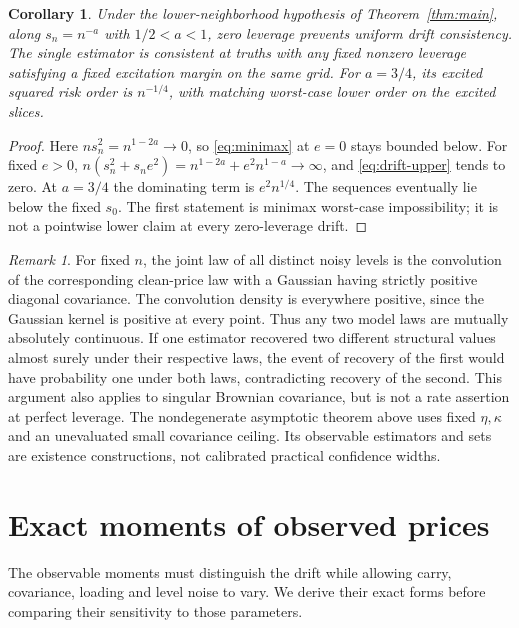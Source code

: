 \documentclass[11pt,a4paper]{amsart}
\theoremstyle{plain}
\newtheorem{corollary}[theorem]{Corollary}
\theoremstyle{definition}
\theoremstyle{remark}
\newtheorem{remark}[theorem]{Remark}
\begin{document}
\begin{corollary}\label{cor:separation}
Under the lower-neighborhood hypothesis of Theorem~\ref{thm:main}, along
$s_n=n^{-a}$ with $1/2<a<1$, zero leverage prevents uniform drift
consistency. The single estimator is consistent at truths with any fixed
nonzero leverage satisfying a fixed excitation margin on the same grid.
For $a=3/4$, its excited squared risk order is $n^{-1/4}$, with matching
worst-case lower order on the excited slices.
\end{corollary}
\begin{proof}
Here $ns_n^2=n^{1-2a}\to0$, so \eqref{eq:minimax} at $e=0$ stays bounded
below. For fixed $e>0$,
$n(s_n^2+s_ne^2)=n^{1-2a}+e^2n^{1-a}\to\infty$, and
\eqref{eq:drift-upper} tends to zero. At $a=3/4$ the dominating term is
$e^2n^{1/4}$. The sequences eventually lie below the fixed $s_0$.
The first statement is minimax worst-case impossibility; it is not a
pointwise lower claim at every zero-leverage drift.
\end{proof}

\begin{remark}\label{rem:finite-noise}
For fixed $n$, the joint law of all distinct noisy levels is the convolution
of the corresponding clean-price law with a Gaussian having strictly
positive diagonal covariance. The convolution density is everywhere
positive, since the Gaussian kernel is positive at every point. Thus any
two model laws are mutually absolutely continuous. If one estimator
recovered two different structural values almost surely under their
respective laws, the event of recovery of the first would have probability
one under both laws, contradicting recovery of the second. This argument
also applies to singular Brownian covariance, but is not a rate assertion
at perfect leverage. The nondegenerate asymptotic theorem above uses fixed
$\eta,\kappa$ and an unevaluated small covariance ceiling. Its observable
estimators and sets are existence constructions, not calibrated practical
confidence widths.
\end{remark}

\section{Exact moments of observed prices}\label{sec:moments}

The observable moments must distinguish the drift while allowing carry,
covariance, loading and level noise to vary. We derive their exact forms
before comparing their sensitivity to those parameters.
\end{document}
